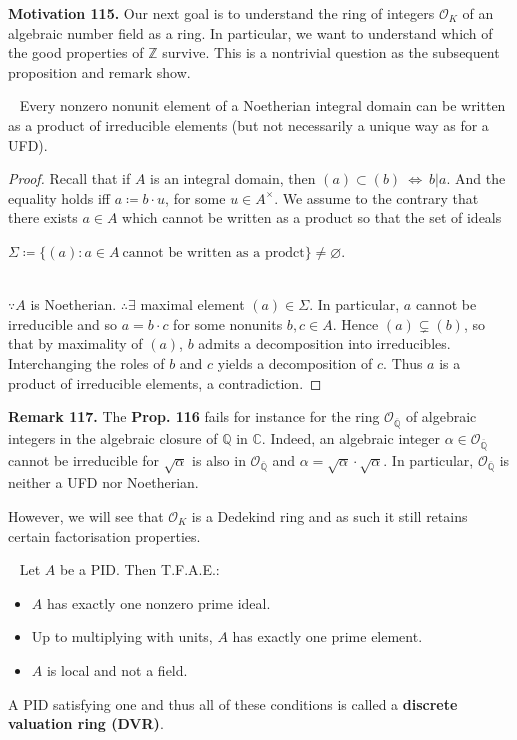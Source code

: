\documentclass[12pt,a4paper,footinclude=true,headinclude=true]{scrbook} %
\newenvironment{proposition}[2][]
{\renewcommand\theinnercustomprop{#2}\innercustomprop[#1] 
\begin{mdframed}[backgroundcolor=gray!20]\ }
{\end{mdframed}\endinnercustomprop}
\newenvironment{remark}[2][Remark]
    { \begin{mdframed}[backgroundcolor=gray!20] \textbf{#1 #2.} }
    {  \end{mdframed}}
\newenvironment{motivation}[2][Motivation]
    { \begin{mdframed}[backgroundcolor=red!20] \textbf{#1 #2.} }
    {  \end{mdframed}}
\begin{document}
\begin{motivation}{115}
    Our next goal is to understand the ring of integers $\mathcal{O}_K$ of an algebraic number field as a ring. In particular, we want to understand which of the good properties of $\mathbb{Z}$ survive. This is a nontrivial question as the subsequent proposition and remark show.
\end{motivation}

\begin{proposition}{116}
    Every nonzero nonunit element of a Noetherian integral domain can be written as a product of irreducible elements (but not necessarily a unique way as for a UFD).
\end{proposition}
\begin{proof}
    Recall that if $A$ is an integral domain, then $(a)\subset(b)\ \Leftrightarrow\ b|a$. And the equality holds iff $a\coloneqq b\cdot u$, for some $u\in A^\times$. We assume to the contrary that there exists $a\in A$ which cannot be written as a product so that the set of ideals\\
    \centerline{$\Sigma\coloneqq\{(a):a\in A\ \text{cannot be written as a prodct}\}\neq \varnothing$.} \\ $\because A$ is Noetherian. $\therefore\exists$ maximal element $(a)\in\Sigma$. In particular, $a$ cannot be irreducible and so $a=b\cdot c$ for some nonunits $b,c\in A$. Hence $(a)\subsetneq(b)$, so that by maximality of $(a)$, $b$ admits a decomposition into irreducibles. Interchanging the roles of $b$ and $c$ yields a decomposition of $c$. Thus $a$ is a product of irreducible elements, a contradiction. 
\end{proof}

\begin{remark}{117}
    The \textbf{Prop. 116} fails for instance for the ring $\mathcal{O}_{\overline{\mathbb{Q}}}$ of algebraic integers in the algebraic closure of $\mathbb{Q}$ in $\mathbb{C}$. Indeed, an algebraic integer $\alpha\in \mathcal{O}_{\overline{\mathbb{Q}}}$ cannot be irreducible for $\sqrt{\alpha}$ is also in $\mathcal{O}_{\overline{\mathbb{Q}}}$ and $\alpha=\sqrt{\alpha}\cdot \sqrt{\alpha}$. In particular, $\mathcal{O}_{\overline{\mathbb{Q}}}$ is neither a UFD nor Noetherian.
\end{remark}

However, we will see that $\mathcal{O}_K$ is a Dedekind ring and as such it still retains certain factorisation properties.

\begin{proposition}{118. (Discrete Valuation Ring)}
    Let $A$ be a PID. Then T.F.A.E.:
    \begin{itemize}
        \item[(a)] $A$ has exactly one nonzero prime ideal.
        \item[(b)] Up to multiplying with units, $A$ has exactly one prime element.
        \item[(c)] $A$ is local and not a field.
    \end{itemize}
    A PID satisfying one and thus all of these conditions is called a \textbf{discrete valuation ring (DVR)}.
\end{proposition}
\end{document}
